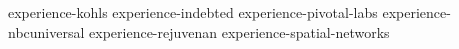 {experience-kohls}
{experience-indebted}
{experience-pivotal-labs}
{experience-nbcuniversal}
{experience-rejuvenan}
{experience-spatial-networks}
